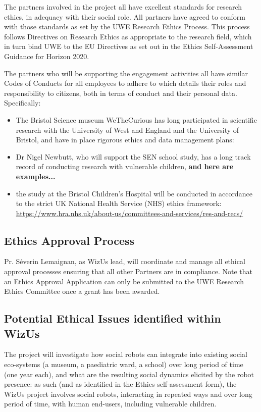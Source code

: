 \documentclass[11pt,a4paper]{report}
\newcommand{\project}{WizUs\xspace}
\newcommand{\TODO}[1]{{\color{red}\textbf{#1}}}
\begin{document}
The partners involved in the project all have excellent standards for research
ethics, in adequacy with their social role.  All partners have agreed to conform
with those standards as set by the UWE Research Ethics Process.  This process
follows Directives on Research Ethics as appropriate to the research field,
which in turn bind UWE to the EU Directives as set out in the Ethics
Self-Assessment Guidance for Horizon 2020.

The partners who will be supporting the engagement activities all have similar
Codes of Conducts for all employees to adhere to which details their roles and
responsibility to citizens, both in terms of conduct and their personal data.
Specifically:

\begin{itemize}
    \item The Bristol Science museum WeTheCurious has long participated in
        scientific research with the University of West and England and the
        University of Bristol, and have in place rigorous ethics and data
        management plans:
    \item Dr Nigel Newbutt, who will support the SEN school study, has a long
        track record of conducting research with vulnerable children, \TODO{and
        here are examples...}
    \item the study at the Bristol Children's Hospital will be conducted in
        accordance to the strict UK National Health Service (NHS) ethics
        framework:
        \url{https://www.hra.nhs.uk/about-us/committees-and-services/res-and-recs/}
\end{itemize}



\subsection{Ethics Approval Process}

Pr. Séverin Lemaignan, as \project lead, will coordinate and manage all ethical
approval processes ensuring that all other Partners are in compliance. Note that
an Ethics Approval Application can only be submitted to the UWE Research Ethics
Committee once a grant has been awarded.

\subsection{Potential Ethical Issues identified within \project}

The project will investigate how social robots can integrate into existing
social eco-systems (a museum, a paediatric ward, a school) over long period of
time (one year each), and what are the resulting social dynamics elicited by the
robot presence: as such (and as identified in the Ethics self-assessment form),
the \project project involves social robots, interacting in repeated ways and
over long period of time, with human end-users, including vulnerable children.
\end{document}

